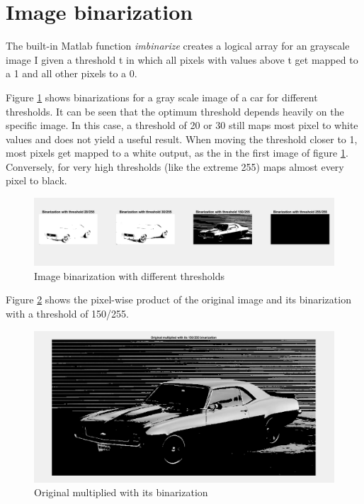 \section{Image binarization}

The built-in Matlab function \textit{imbinarize} creates a logical array for an grayscale image I given a threshold t in which all pixels with values above t get mapped to a 1 and all other pixels to a 0.

Figure \ref{fig:task19} shows binarizations for a gray scale image of a car for different thresholds. It can be seen that the optimum threshold depends heavily on the specific image. In this case, a threshold of 20 or 30 still maps most pixel to white values and does not yield a useful result. When moving the threshold closer to 1, most pixels get mapped to a white output, as the in the first image of figure \ref{fig:task19}. Conversely, for very high thresholds (like the extreme 255) maps almost every pixel to black.

\begin{figure}[!hbt]
  \includegraphics[width=\textwidth]{./img/task19.png}
  \caption{Image binarization with different thresholds}
  \label{fig:task19}
\end{figure}

Figure \ref{fig:task20} shows the pixel-wise product of the original image and its binarization with a threshold of 150/255.

\begin{figure}[!hbt]
  \includegraphics[width=\textwidth]{./img/task20.png}
  \caption{Original multiplied with its binarization}
  \label{fig:task20}
\end{figure}


